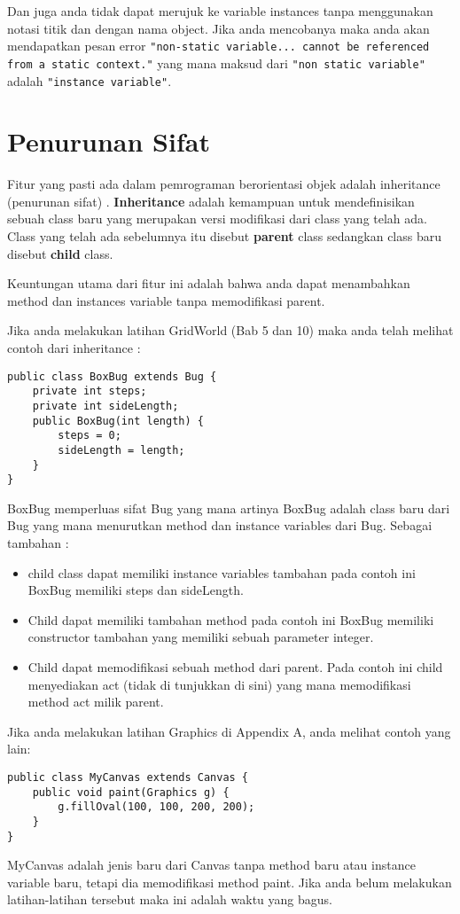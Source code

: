 Dan juga anda tidak dapat merujuk ke variable instances tanpa menggunakan notasi titik dan dengan nama object. Jika anda mencobanya maka anda akan mendapatkan pesan error \texttt{"non-static variable... cannot be referenced from a static context."} yang mana maksud dari \texttt{"non static variable"} adalah \texttt{"instance variable"}.

\section{Penurunan Sifat} %

Fitur yang pasti ada dalam pemrograman berorientasi objek adalah inheritance (penurunan sifat) . \textbf{Inheritance} adalah kemampuan untuk mendefinisikan sebuah class baru yang merupakan versi modifikasi dari class yang telah ada. Class yang telah ada sebelumnya itu disebut \textbf{parent} class sedangkan class baru disebut \textbf{child} class. 

Keuntungan utama dari fitur ini adalah bahwa anda dapat menambahkan method dan instances variable tanpa memodifikasi parent. 

Jika anda melakukan latihan GridWorld (Bab 5 dan 10) maka anda telah melihat contoh dari inheritance :

\begin{lstlisting}
public class BoxBug extends Bug {
	private int steps;
	private int sideLength;
	public BoxBug(int length) {
		steps = 0;
		sideLength = length;
	}
}
\end{lstlisting}

BoxBug memperluas sifat Bug yang mana artinya BoxBug adalah class baru dari Bug yang mana menurutkan method dan instance variables dari Bug. Sebagai tambahan :

\begin{itemize}
	\item{child class dapat memiliki instance variables tambahan pada contoh ini BoxBug memiliki steps dan sideLength. }
	\item{Child dapat memiliki tambahan method pada contoh ini BoxBug memiliki constructor tambahan yang memiliki sebuah parameter integer.}
	\item{Child dapat memodifikasi sebuah method dari parent. Pada contoh ini child menyediakan act (tidak di tunjukkan di sini) yang mana memodifikasi method act milik parent.}
\end{itemize}

Jika anda melakukan latihan Graphics di Appendix A, anda melihat contoh yang lain:

\begin{lstlisting}
public class MyCanvas extends Canvas {
	public void paint(Graphics g) {
		g.fillOval(100, 100, 200, 200);
	}
}
\end{lstlisting}

MyCanvas adalah jenis baru dari Canvas tanpa method baru atau instance variable baru, tetapi dia memodifikasi method paint. Jika anda belum melakukan latihan-latihan tersebut maka ini adalah waktu yang bagus.
